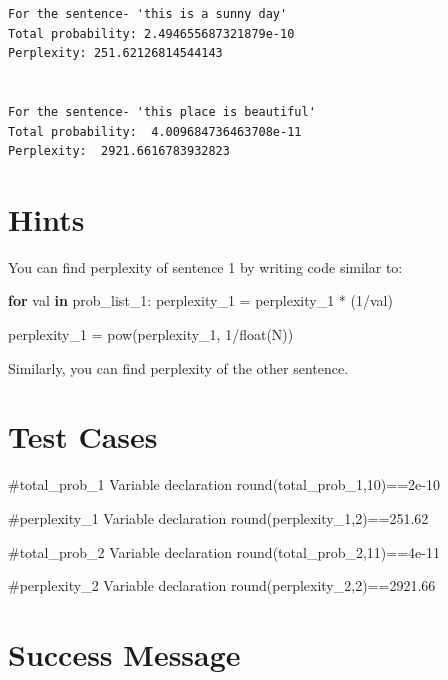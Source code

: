 \documentclass[11pt]{article}
\newenvironment{Shaded}{}{}
\newcommand{\KeywordTok}[1]{\textcolor[rgb]{0.00,0.44,0.13}{\textbf{{#1}}}}
\newcommand{\DecValTok}[1]{\textcolor[rgb]{0.25,0.63,0.44}{{#1}}}
\newcommand{\NormalTok}[1]{{#1}}
\newcommand{\ControlFlowTok}[1]{\textcolor[rgb]{0.00,0.44,0.13}{\textbf{{#1}}}}
\newcommand{\OperatorTok}[1]{\textcolor[rgb]{0.40,0.40,0.40}{{#1}}}
\newcommand{\BuiltInTok}[1]{{#1}}
\begin{document}
    \begin{Verbatim}[commandchars=\\\{\}]
For the sentence- 'this is a sunny day'
Total probability: 2.494655687321879e-10
Perplexity: 251.62126814544143


For the sentence- 'this place is beautiful'
Total probability:  4.009684736463708e-11
Perplexity:  2921.6616783932823

    \end{Verbatim}

    \hypertarget{hints}{%
\section{Hints}\label{hints}}

You can find perplexity of sentence 1 by writing code similar to:

\begin{Shaded}
\begin{Highlighting}[]
\ControlFlowTok{for}\NormalTok{ val }\KeywordTok{in}\NormalTok{ prob_list_1:}
\NormalTok{    perplexity_1 }\OperatorTok{=}\NormalTok{ perplexity_1 }\OperatorTok{*}\NormalTok{ (}\DecValTok{1}\OperatorTok{/}\NormalTok{val)}

\NormalTok{perplexity_1 }\OperatorTok{=} \BuiltInTok{pow}\NormalTok{(perplexity_1, }\DecValTok{1}\OperatorTok{/}\BuiltInTok{float}\NormalTok{(N)) }
\end{Highlighting}
\end{Shaded}

Similarly, you can find perplexity of the other sentence.

\hypertarget{test-cases}{%
\section{Test Cases}\label{test-cases}}

\#total\_prob\_1 Variable declaration round(total\_prob\_1,10)==2e-10

\#perplexity\_1 Variable declaration round(perplexity\_1,2)==251.62

\#total\_prob\_2 Variable declaration round(total\_prob\_2,11)==4e-11

\#perplexity\_2 Variable declaration round(perplexity\_2,2)==2921.66

    \hypertarget{success-message}{%
\section{Success Message}\label{success-message}}
\end{document}
